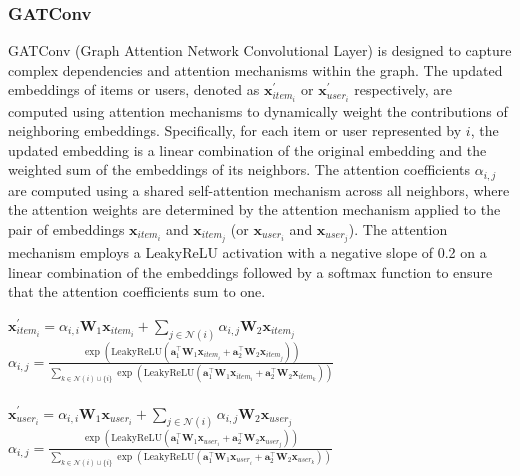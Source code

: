 \documentclass{scrartcl}
\begin{document}
\subsubsection{GATConv\cite{gatconv}} 

\quad GATConv (Graph Attention Network Convolutional Layer) is designed to capture complex dependencies and attention mechanisms within the graph. The updated embeddings of items or users, denoted as $\mathbf{x}^{\prime}_{item_i}$ or $\mathbf{x}^{\prime}_{user_i}$ respectively, are computed using attention mechanisms to dynamically weight the contributions of neighboring embeddings. Specifically, for each item or user represented by $i$, the updated embedding is a linear combination of the original embedding and the weighted sum of the embeddings of its neighbors. The attention coefficients $\alpha_{i,j}$ are computed using a shared self-attention mechanism across all neighbors, where the attention weights are determined by the attention mechanism applied to the pair of embeddings $\mathbf{x}_{item_i}$ and $\mathbf{x}_{item_j}$ (or $\mathbf{x}_{user_i}$ and $\mathbf{x}_{user_j}$). The attention mechanism employs a LeakyReLU activation with a negative slope of 0.2 on a linear combination of the embeddings followed by a softmax function to ensure that the attention coefficients sum to one.\\ 

\begin{center}
    $\mathbf{x}^{\prime}_{item_{i}} = \alpha_{i,i}\mathbf{W}_{1}\mathbf{x}_{item_{i}} + \sum_{j \in \mathcal{N}(i)} \alpha_{i,j}\mathbf{W}_{2}\mathbf{x}_{item_{j}}$\\
    $\alpha_{i,j} =
    \frac{
    \exp\left(\mathrm{LeakyReLU}\left(
    \mathbf{a}^{\top}_{1} \mathbf{W}_{1}\mathbf{x}_{item_{i}}
    + \mathbf{a}^{\top}_{2} \mathbf{W}_{2}\mathbf{x}_{item_{j}}
    \right)\right)}
    {\sum_{k \in \mathcal{N}(i) \cup \{ i \}}
    \exp\left(\mathrm{LeakyReLU}\left(
    \mathbf{a}^{\top}_{1} \mathbf{W}_{1}\mathbf{x}_{item_{i}}
    + \mathbf{a}^{\top}_{2}\mathbf{W}_{2}\mathbf{x}_{item_{k}}
    \right)\right)}$ \\~\\
    $\mathbf{x}^{\prime}_{user_{i}} = \alpha_{i,i}\mathbf{W}_{1}\mathbf{x}_{user_{i}} + \sum_{j \in \mathcal{N}(i)} \alpha_{i,j}\mathbf{W}_{2}\mathbf{x}_{user_{j}}$\\
    $\alpha_{i,j} =
    \frac{
    \exp\left(\mathrm{LeakyReLU}\left(
    \mathbf{a}^{\top}_{1} \mathbf{W}_{1}\mathbf{x}_{user_{i}}
    + \mathbf{a}^{\top}_{2} \mathbf{W}_{2}\mathbf{x}_{user_{j}}
    \right)\right)}
    {\sum_{k \in \mathcal{N}(i) \cup \{ i \}}
    \exp\left(\mathrm{LeakyReLU}\left(
    \mathbf{a}^{\top}_{1} \mathbf{W}_{1}\mathbf{x}_{user_{i}}
    + \mathbf{a}^{\top}_{2}\mathbf{W}_{2}\mathbf{x}_{user_{k}}
    \right)\right)}$
\end{center}
\end{document}

